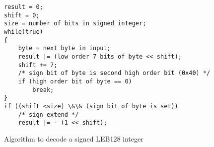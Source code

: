 
\begin{figure}[here]
\caption{Algorithm to decode a signed LEB128 integer}
\begin{lstlisting}
result = 0;
shift = 0;
size = number of bits in signed integer;
while(true)
{
    byte = next byte in input;
    result |= (low order 7 bits of byte << shift);
    shift += 7;
    /* sign bit of byte is second high order bit (0x40) */
    if (high order bit of byte == 0)
        break;
}
if ((shift <size) \&\& (sign bit of byte is set))
    /* sign extend */
    result |= - (1 << shift);
\end{lstlisting}
\end{figure}
